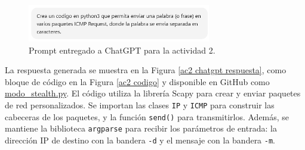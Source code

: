 \documentclass[letter,12pt]{article}
\begin{document}
\begin{figure}[H]
        \centering
        \includegraphics[width=8cm]{actividades/ac2/chatgpt_prompt.png}
        \caption{Prompt entregado a ChatGPT para la actividad 2.}
        \label{ac2 chatgpt prompt}
\end{figure}

 La respuesta generada se muestra en la Figura \ref{ac2 chatgpt respuesta}, como bloque de código en la Figura \ref{ac2 codigo} y disponible en GitHub como \href{https://github.com/BrunoTrone1/cripto_lab1/blob/main/modo_stealth.py}{modo\_stealth.py}. El código utiliza la librería Scapy para crear y enviar paquetes de red personalizados. Se importan las clases \verb|IP| y  \verb|ICMP| para construir las cabeceras de los paquetes, y la función \verb|send()| para transmitirlos. Además, se mantiene la biblioteca \verb|argparse| para recibir los parámetros de entrada: la dirección IP de destino con la bandera \verb|-d| y el mensaje con la bandera \verb|-m|.
\end{document}
